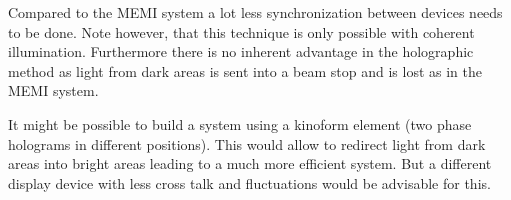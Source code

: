Compared to the MEMI system a lot less synchronization between devices
needs to be done. Note however, that this technique is only possible
with coherent illumination. Furthermore there is no inherent advantage
in the holographic method as light from dark areas is sent into a beam
stop and is lost as in the MEMI system.

It might be possible to build a system using a kinoform element (two
phase holograms in different positions). This would allow to redirect
light from dark areas into bright areas leading to a much more
efficient system. But a different display device with less cross talk
and fluctuations would be advisable for this.

